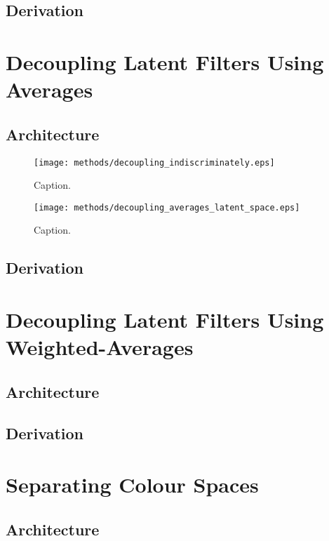 \subsection{Derivation}



%
%
%
%
%
\section{Decoupling Latent Filters Using Averages}
\lipsum[2]
\subsection{Architecture}
\begin{figure}[H]
\centering
\captionsetup{justification=centering}
\texttt{[image: methods/decoupling\_indiscriminately.eps]}
\caption{Caption.}
\label{fig:decoupling_indiscriminately}
\end{figure}

\begin{figure}[H]
\centering
\captionsetup{justification=centering}
\texttt{[image: methods/decoupling\_averages\_latent\_space.eps]}
\caption{Caption.}
\label{fig:decoupling_averages_latent_space}
\end{figure}

\subsection{Derivation}

%
%
%
%
%
\section{Decoupling Latent Filters Using Weighted-Averages}
\lipsum[2]
\subsection{Architecture}
\subsection{Derivation}

%
%
%
%
%
\section{Separating Colour Spaces}
\lipsum[2]
\subsection{Architecture}
